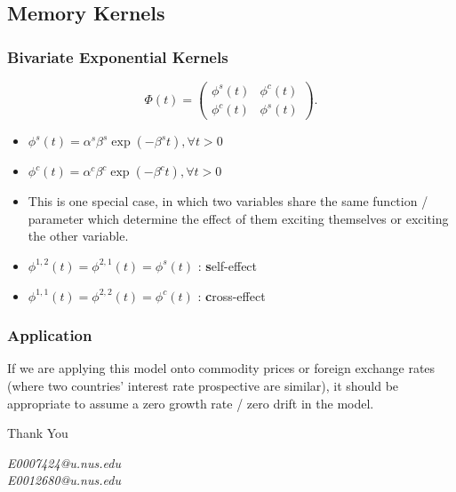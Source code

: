 \documentclass{beamer}
\begin{document}
\subsection{Memory Kernels}
\begin{frame}
\frametitle{Bivariate Exponential Kernels}
\[
\Phi(t) = 
\left( \begin{array}{ccc}
\phi^s(t) & \phi^c(t) \\
\phi^c(t) & \phi^s(t) \end{array} \right).
\]
\begin{itemize}
	\item $\phi^s(t) = \alpha^s \beta^s \exp(-\beta^s t), \forall t > 0$
	\item $\phi^c(t) = \alpha^c \beta^c \exp(-\beta^c t), \forall t > 0$
	\item This is one special case, in which two variables share the same function / parameter which determine the effect of them exciting themselves or exciting the other variable.
	\item $\phi^{1,2}(t) = \phi^{2,1}(t) = \phi^s(t)$ : \textbf{s}elf-effect
	\item $\phi^{1,1}(t) = \phi^{2,2}(t) = \phi^c(t)$ : \textbf{c}ross-effect
\end{itemize}
\end{frame}

\begin{frame}
\frametitle{Application}
If we are applying this model onto commodity prices or foreign exchange rates (where two countries' interest rate prospective are similar), it should be appropriate to assume a zero growth rate / zero drift in the model.
\end{frame}

\begin{frame}
\Huge{\centerline{Thank You}}
\begin{center}
\begin{normalsize}
\emph{E0007424@u.nus.edu}\\
\emph{E0012680@u.nus.edu}
\end{normalsize}
\end{center}
\end{frame}


\end{document}
